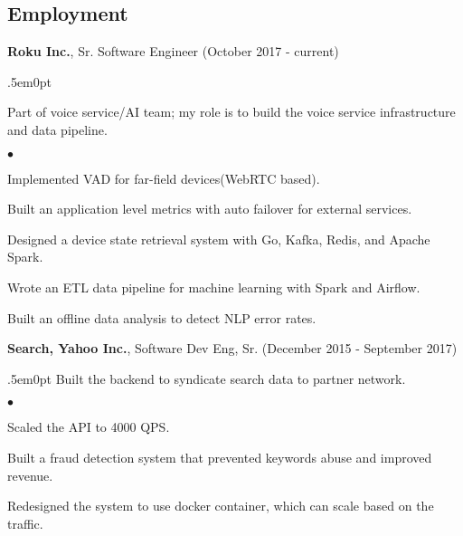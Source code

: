 \documentclass[margin, line, 10pt]{res}
\newenvironment{list2}{
  \begin{list}{$\bullet$}{%
      \setlength{\itemsep}{0in}
      \setlength{\parsep}{0in} \setlength{\parskip}{0in}
      \setlength{\topsep}{0in} \setlength{\partopsep}{0in}
      \setlength{\leftmargin}{0.2in}}}{\end{list}}
\begin{document}
\begin{resume}
\section{Employment}


\vspace{.05cm}

{\Large {\bf Roku Inc.}},  Sr. Software Engineer \hfill (October 2017 - current)\\
\begin{adjustwidth}{.5em}{0pt}

  \vspace{-.3cm}
  Part of voice service/AI team; my role is to build the voice service infrastructure and data pipeline.

  \begin{list2}
    \vspace{.2cm}
  \item Implemented VAD for far-field devices(WebRTC based).
  \item Built an application level metrics with auto failover for external services.
  \item Designed a device state retrieval system with Go, Kafka, Redis, and Apache Spark.
  \item Wrote an ETL data pipeline for machine learning with Spark and Airflow.
  \item Built an offline data analysis to detect NLP error rates.
  \end{list2}
  \vspace{.05cm}
\end{adjustwidth}

{\Large {\bf Search, Yahoo Inc.}}, Software Dev Eng, Sr. \hfill (December 2015 - September 2017)\\
\begin{adjustwidth}{.5em}{0pt}
  \vspace{-.3cm}
  Built the backend to syndicate search data to partner network.
  \begin{list2}
  \vspace{.2cm}
  \item Scaled the API to 4000 QPS.
  \item Built a fraud detection system that prevented keywords abuse and improved revenue.
  \item Redesigned the system to use docker container, which can scale based on the traffic.
  \end{list2}
  \vspace{.05cm}
\end{adjustwidth}


\end{resume}
\end{document}
